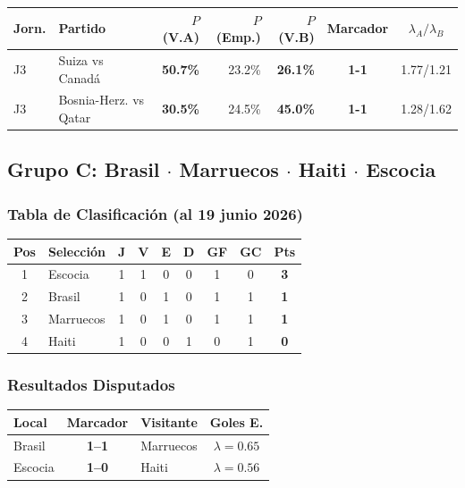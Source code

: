\documentclass[11pt,a4paper]{article}
\newcommand{\prob}[1]{\textbf{#1\%}}
\begin{document}
\begin{center}
\begin{tabular}{@{}llrrrcc@{}}
\toprule
\textbf{Jorn.} & \textbf{Partido} & \textbf{$P$(V.A)} & \textbf{$P$(Emp.)} & \textbf{$P$(V.B)} & \textbf{Marcador} & \textbf{$\lambda_A/\lambda_B$} \\
\midrule
  J3 & Suiza vs Canadá & \cellcolor{yellow!30}\prob{50.7} & 23.2\% & \cellcolor{red!15}\prob{26.1} & \textbf{1-1} & 1.77/1.21 \\
  J3 & Bosnia-Herz. vs Qatar & \cellcolor{red!15}\prob{30.5} & 24.5\% & \cellcolor{yellow!30}\prob{45.0} & \textbf{1-1} & 1.28/1.62 \\
\bottomrule
\end{tabular}
\end{center}


\subsection{Grupo C: Brasil $\cdot$ Marruecos $\cdot$ Haiti $\cdot$ Escocia}

\subsubsection*{Tabla de Clasificación (al 19 junio 2026)}


\begin{center}
\begin{tabular}{@{}clccccccc@{}}
\toprule
\textbf{Pos} & \textbf{Selección} & \textbf{J} & \textbf{V} & \textbf{E} & \textbf{D} & \textbf{GF} & \textbf{GC} & \textbf{Pts} \\
\midrule
  \cellcolor{green!25}1 & \cellcolor{green!25}Escocia & 1 & 1 & 0 & 0 & 1 & 0 & \textbf{3} \\
  \cellcolor{green!25}2 & \cellcolor{green!25}Brasil & 1 & 0 & 1 & 0 & 1 & 1 & \textbf{1} \\
  \cellcolor{yellow!20}3 & \cellcolor{yellow!20}Marruecos & 1 & 0 & 1 & 0 & 1 & 1 & \textbf{1} \\
  4 & Haiti & 1 & 0 & 0 & 1 & 0 & 1 & \textbf{0} \\
\bottomrule
\end{tabular}
\end{center}

\subsubsection*{Resultados Disputados}

\begin{center}
\begin{tabular}{@{}lclc@{}}
\toprule
\textbf{Local} & \textbf{Marcador} & \textbf{Visitante} & \textbf{Goles E.} \\
\midrule
  Brasil & \textbf{1--1} & Marruecos & $\lambda=0.65$ \\
  Escocia & \textbf{1--0} & Haiti & $\lambda=0.56$ \\
\bottomrule
\end{tabular}
\end{center}
\end{document}
